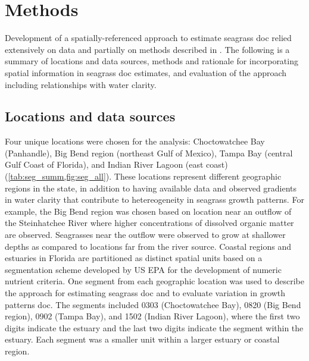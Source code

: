 \documentclass[letterpaper,12pt,oneside]{article}\usepackage[]{graphicx}\usepackage[]{color}
\begin{document}
\section{Methods}

Development of a spatially-referenced approach to estimate seagrass \ac{doc} relied extensively on data and partially on methods described in .  The following is a summary of locations and data sources, methods and rationale for incorporating spatial information in seagrass \ac{doc} estimates, and evaluation of the approach including relationships with water clarity.   

\subsection{Locations and data sources}

Four unique locations were chosen for the analysis: Choctowatchee Bay (Panhandle), Big Bend region (northeast Gulf of Mexico), Tampa Bay (central Gulf Coast of Florida), and Indian River Lagoon (east coast) (\cref{tab:seg_summ,fig:seg_all}).  These locations represent different geographic regions in the state, in addition to having available data and observed gradients in water clarity that contribute to hetereogeneity in seagrass growth patterns.  For example, the Big Bend region was chosen based on location near an outflow of the Steinhatchee River where higher concentrations of dissolved organic matter are observed.  Seagrasses near the outflow were observed to grow at shallower depths as compared to locations far from the river source.  Coastal regions and estuaries in Florida are partitioned as distinct spatial units based on a segmentation scheme developed by US \ac{EPA} for the development of numeric nutrient criteria.  One segment from each geographic location was used to describe the approach for estimating seagrass \ac{doc} and to evaluate variation in growth patterns \ac{doc}.  The segments included 0303 (Choctowatchee Bay), 0820 (Big Bend region), 0902 (Tampa Bay), and 1502 (Indian River Lagoon), where the first two digits indicate the estuary and the last two digits indicate the segment within the estuary.  Each segment was a smaller unit within a larger estuary or coastal region.   
\end{document}
